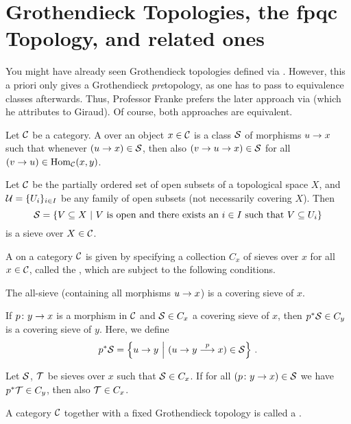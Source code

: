 \documentclass[a4paper, 10pt, oneside, DIV=9, chapterprefix=true, numbers=enddot, bibliography=totoc]{scrbook}
\begin{document}
\section{Grothendieck Topologies, the fpqc Topology, and related ones}
You might have already seen Grothendieck topologies defined via . However, this a priori only gives a Grothendieck \emph{pre}topology, as one has to pass to equivalence classes afterwards. Thus, Professor Franke prefers the later approach via  (which he attributes to Giraud). Of course, both approaches are equivalent.
\begin{defi}
	Let $\mathcal{C}$ be a category. A  over an object $x\in \mathcal{C}$ is a class $\mathcal{S}$ of morphisms $u\morphism x$ such that whenever $(u\morphism x)\in \Ss$, then also $(v\morphism u\morphism x)\in\Ss$ for all $(v\morphism u)\in\Hom_\Cc(x,y)$.
\end{defi}
\begin{exm}
	Let $\mathcal{C}$ be the partially ordered set of open subsets of a topological space $X$, and $\mathcal{U}=\{U_i\}_{i\in I}$ be any family of open subsets (not necessarily covering $X$). Then
	\begin{equation*}
		\mathcal{S}=\left\{V\subseteq X\ \middle|\  V\text{ is open and there exists an }i\in I\text{ such that }V\subseteq U_i\right\}
	\end{equation*}
	is a sieve over $X\in \mathcal{C}$.
\end{exm}
\begin{defi}\label{def:GrothendieckTopo}
	A  on a category $\mathcal{C}$ is given by specifying a collection $ C_x$ of sieves over $x$ for all $x\in \mathcal{C}$, called the , which are subject to the following conditions.
	\begin{alphanumerate}
		\item The all-sieve (containing all morphisms $u\morphism x$) is a covering sieve of $x$.
		\item If $p\colon y\morphism x$ is a morphism in $\mathcal{C}$ and $\mathcal{S}\in C_x$ a covering sieve of $x$, then $p^*\mathcal{S}\in C_y$ is a covering sieve of $y$. Here, we define
		\begin{equation*}
			p^*\Ss=\left\{u\to y\st (u\to y\morphism[p]x)\in \Ss\right\}\,.
		\end{equation*}
		\item Let $\mathcal{S}$, $\mathcal{T}$ be sieves over $x$ such that $\mathcal{S}\in  C_x$. If for all $(p\colon y\morphism x)\in \Ss$ we have $p^*\mathcal{T}\in C_y$, then also $\mathcal{T}\in C_x$.
	\end{alphanumerate}
	A category $\mathcal{C}$ together with a fixed Grothendieck topology is called a .
\end{defi}
\end{document}
